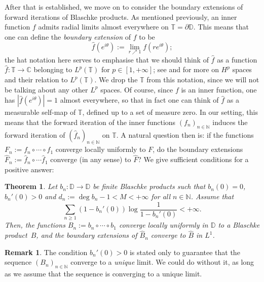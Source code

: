 \documentclass[a4paper,11pt]{article}
\theoremstyle{plain}
\newtheorem{theorem}{Theorem}[section]
\theoremstyle{definition}
\theoremstyle{definition}
\newtheorem*{remark}{Remark}
\def\Cx{\mathbb{C}}
\def\D{\mathbb{D}}
\begin{document}
After that is established, we move on to consider the boundary extensions of forward iterations of Blaschke products. As mentioned previously, an inner function $f$ admits radial limits almost everywhere on $\mathbb{T} = \partial\D$. This means that one can define the \textit{boundary extension} of $f$ to be
\[ \hat{f}(e^{i\theta}) := \lim_{r\nearrow 1} f(re^{i\theta}); \]
the hat notation here serves to emphasise that we should think of $\hat{f}$ as a function $\hat{f}:\mathbb{T}\to\Cx$ belonging to $L^p(\mathbb{T})$ for $p\in[1, +\infty]$; see \cite{Dur70} and \cite[Chapter 17]{Rud87} for more on $H^p$ spaces and their relation to $L^p(\mathbb{T})$. We drop the $\mathbb{T}$ from this notation, since we will not be talking about any other $L^p$ spaces. Of course, since $f$ is an inner function, one has $|\hat{f}(e^{i\theta})| = 1$ almost everywhere, so that in fact one can think of $\hat{f}$ as a measurable self-map of $\mathbb{T}$, defined up to a set of measure zero. In our setting, this means that the forward iteration of the inner functions $(f_n)_{n\in\mathbb{N}}$ induces the forward iteration of $(\hat{f}_n)_{n\in\mathbb{N}}$ on $\mathbb{T}$. A natural question then is: if the functions $F_n := f_n\circ\cdots\circ f_1$ converge locally uniformly to $F$, do the boundary extensions $\hat{F}_n := \hat{f}_n\circ\cdots \hat{f}_1$ converge (in any sense) to $\hat{F}$? We give sufficient conditions for a positive answer:
\begin{theorem} \label{thm:boundary}
Let $b_n:\D\to\D$ be finite Blaschke products such that $b_n(0) = 0$, $b_n'(0) > 0$ and $d_n := \deg b_n - 1 < M < +\infty$ for all $n\in\mathbb{N}$. Assume that
\begin{equation} \label{eq:FC}
    \sum_{n\geq 1} (1 - b_n'(0))\log\frac{1}{1 - b_n'(0)} < +\infty.
\end{equation}
Then, the functions $B_n := b_n\circ\cdots\circ b_1$ converge locally uniformly in $\D$ to a Blaschke product~$B$, and the boundary extensions of $\hat{B}_n$ converge to $\hat{B}$ in $L^1$.
\end{theorem}
\begin{remark}
The condition $b_n'(0) > 0$ is stated only to guarantee that the sequence $(B_n)_{n\in\mathbb{N}}$ converge to a \textit{unique} limit. We could do without it, as long as we assume that the sequence is converging to a unique limit.
\end{remark}
\end{document}
